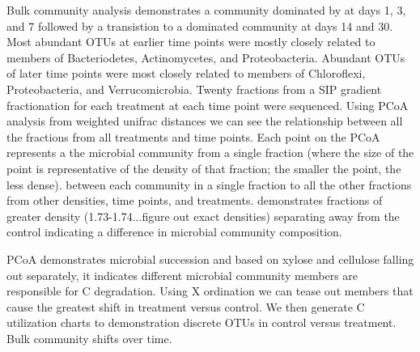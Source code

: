 Bulk community analysis demonstrates a community dominated by at days 1, 3, and 7 followed by a transistion to a dominated community at days 14 and 30. Most abundant OTUs at earlier time points were mostly closely related to members of Bacteriodetes, Actinomycetes, and Proteobacteria.  Abundant OTUs of later time points were most closely related to members of Chloroflexi, Proteobacteria, and Verrucomicrobia.  Twenty fractions from a SIP gradient fractionation for each treatment at each time point were sequenced.  Using PCoA analysis from weighted unifrac distances we can see the relationship between all the fractions from all treatments and time points.  Each point on the PCoA represents a the microbial community from a single fraction (where the size of the point is representative of the density of that fraction; the smaller the point, the less dense).   
between each community in a single fraction to all the other fractions from other densities, time points, and treatments.  
demonstrates fractions of greater density (1.73-1.74...figure out exact densities) separating away from the control indicating a difference in microbial community composition.          

PCoA demonstrates microbial succession and based on xylose and cellulose falling out separately, it indicates different microbial community members are responsible for C degradation.  Using X ordination we can tease out members that cause the greatest shift in treatment versus control.  We then generate C utilization charts to demonstration discrete OTUs in control versus treatment.  Bulk community shifts over time.  